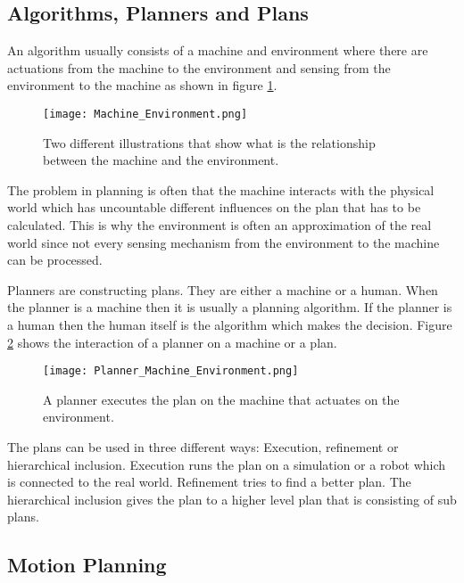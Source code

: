 \subsection{Algorithms, Planners and Plans} \label{sec:Algorithms, Planners and Plans}
An algorithm usually consists of a machine and environment where there are actuations from the machine to the environment and sensing from the environment to the machine as shown in figure \ref{fig:Machine and Environment interaction}.
\begin{figure}[H]
    \centering
    \texttt{[image: Machine\_Environment.png]}
    \caption{Two different illustrations that show what is the relationship between the machine and the environment. \cite{planning_algorithms_steven_m_lavalle}}
    \label{fig:Machine and Environment interaction}
\end{figure}
The problem in planning is often that the machine interacts with the physical world which has uncountable different influences on the plan that has to be calculated. This is why the environment is often an approximation of the real world since not every sensing mechanism from the environment to the machine can be processed.

Planners are constructing plans. They are either a machine or a human. When the planner is a machine then it is usually a planning algorithm. If the planner is a human then the human itself is the algorithm which makes the decision. Figure \ref{fig:Planner Machine Environment} shows the interaction of a planner on a machine or a plan.
\begin{figure}[H]
    \centering
    \texttt{[image: Planner\_Machine\_Environment.png]}
    \caption{A planner executes the plan on the machine that actuates on the environment. \cite{planning_algorithms_steven_m_lavalle}}
    \label{fig:Planner Machine Environment}
\end{figure}

The plans can be used in three different ways: Execution, refinement or hierarchical inclusion. Execution runs the plan on a simulation or a robot which is connected to the real world. Refinement tries to find a better plan. The hierarchical inclusion gives the plan to a higher level plan that is consisting of sub plans. \cite{planning_algorithms_steven_m_lavalle}

\subsection{Motion Planning} \label{sec:Motion Planning}

